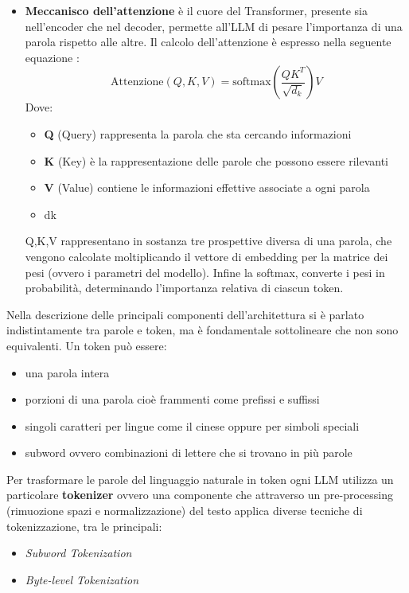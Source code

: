 \documentclass{article}
\begin{document}
\begin{itemize}
\begin{itemize}
    \item \textbf{Meccanisco dell'attenzione} è il cuore del Transformer, presente sia nell'encoder che nel decoder, permette all'LLM di pesare l'importanza di una parola rispetto alle altre. Il calcolo dell'attenzione è espresso nella seguente equazione \cite{vaswani2017attention}:
    \[
        \text{Attenzione}(Q, K, V) = \text{softmax}\left(\frac{QK^T}{\sqrt{d_k}}\right) V
    \]
    Dove:
    \begin{itemize}
        \item \textbf{Q} (Query) rappresenta la parola che sta cercando informazioni
        \item \textbf{K} (Key) è la rappresentazione delle parole che possono essere rilevanti
        \item \textbf{V} (Value) contiene le informazioni effettive associate a ogni parola
        \item dk
    \end{itemize}
    Q,K,V rappresentano in sostanza tre prospettive diversa di una parola, che vengono calcolate moltiplicando il vettore di embedding per la matrice dei pesi (ovvero i parametri del modello). Infine la softmax,  converte i pesi in probabilità, determinando l'importanza relativa di ciascun token.
\end{itemize}
Nella descrizione delle principali componenti dell'architettura si è parlato indistintamente tra parole e token, ma è fondamentale sottolineare che non sono equivalenti. Un token può essere:
\begin{itemize}
    \item una parola intera
    \item porzioni di una parola cioè frammenti come prefissi e suffissi 
    \item singoli caratteri per lingue come il cinese oppure per simboli speciali
    \item subword ovvero combinazioni di lettere che si trovano in più parole
\end{itemize}
Per trasformare le parole del linguaggio naturale in token ogni LLM utilizza un particolare \textbf{tokenizer} ovvero una componente che attraverso un pre-processing (rimuozione spazi e normalizzazione) del testo applica diverse tecniche di tokenizzazione, tra le principali:
\begin{itemize}
    \item \textit{Subword Tokenization}
    \item \textit{Byte-level Tokenization}
\end{itemize}


\end{itemize}
\end{document}
